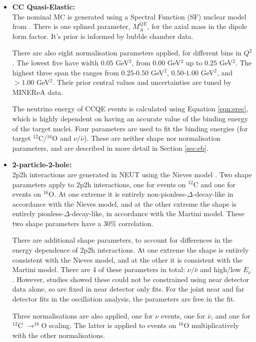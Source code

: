 \begin{itemize}

\item \textbf{CC Quasi-Elastic:}\\
The nominal MC is generated using a Spectral Function (SF) nuclear model from \cite{benhar}. There is one splined parameter, $M^{QE}_{A}$, for the axial mass in the dipole form factor. It's prior is informed by bubble chamber data\cite{tn344}. 

There are also eight normalisation parameters applied, for different bins in $Q^2$. The lowest five have width $0.05$ GeV$^2$, from $0.00$ GeV$^2$ up to $0.25$ GeV$^2$. The highest three span the ranges from $0.25$-$0.50$ GeV$^2$, $0.50$-$1.00$ GeV$^2$, and $>1.00$ GeV$^2$. Their prior central values and uncertainties are tuned by MINER$\nu$A \cite{minerva} data. 

The neutrino energy of CCQE events is calculated using Equation \ref{eqn:erec}, which is highly dependent on having an accurate value of the binding energy of the target nuclei. Four parameters are used to fit the binding energies (for target $^{12}$C/$^{16}$O and $\nu/\bar{\nu}$). These are neither shape nor normalisation parameters, and are described in more detail in Section \ref{sec:eb}.

\item \textbf{2-particle-2-hole:}\\
2p2h interactions are generated in NEUT using the Nieves model \cite{Nieves}. Two shape parameters apply to 2p2h interactions, one for events on $^{12}$C and one for events on $^{16}$O.  At one extreme it is entirely non-pionless-$\Delta$-decay-like in accordance with the Nieves model, and at the other extreme the shape is entirely pionless-$\Delta$-decay-like, in accordance with the Martini model\cite{Martini}. These two shape parameters have a 30$\%$ correlation.

There are additional shape parameters, to account for differences in the energy dependence of 2p2h interactions. At one extreme the shape is entirely consistent with the Nieves model, and at the other it is consistent with the Martini model. There are 4 of these parameters in total: $\nu/\bar{\nu}$ and high/low $E_{\nu}$. However, studies showed these could not be constrained using near detector data alone, so are fixed in near detector only fits. For the joint near and far detector fits in the oscillation analysis, the parameters are free in the fit. 

Three normalisations are also applied, one for $\nu$ events, one for $\bar{\nu}$, and one for $^{12}$C $\rightarrow ^{16}$O scaling. The latter is applied to events on $^{16}$O multiplicatively with the other normalisations.


\end{itemize}
